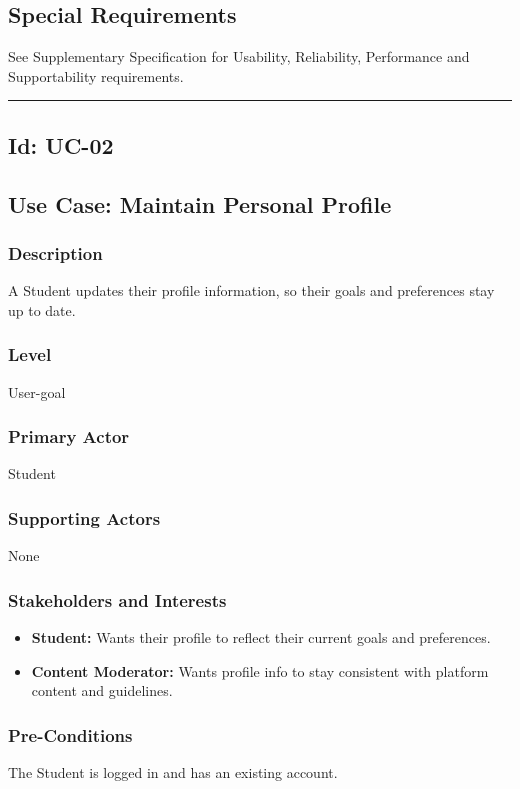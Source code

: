 \documentclass[10pt,letterpaper]{article}
\newcommand{\ucseparator}{\vspace{1em}\noindent\rule{\linewidth}{0.4pt}\vspace{1.5em}}
\begin{document}
\subsection*{Special Requirements}
See Supplementary Specification for Usability, Reliability, Performance and Supportability requirements.

\ucseparator

\subsection*{Id: UC-02}

\subsection*{Use Case: Maintain Personal Profile}

\subsubsection*{Description}
A Student updates their profile information, so their goals and preferences stay up to date.

\subsubsection*{Level}
User-goal

\subsubsection*{Primary Actor}
Student

\subsubsection*{Supporting Actors}
None

\subsubsection*{Stakeholders and Interests}
\begin{itemize}
    \item \textbf{Student:} Wants their profile to reflect their current goals and preferences.
    \item \textbf{Content Moderator:} Wants profile info to stay consistent with platform content and guidelines.
\end{itemize}

\subsubsection*{Pre-Conditions}
The Student is logged in and has an existing account.
\end{document}
